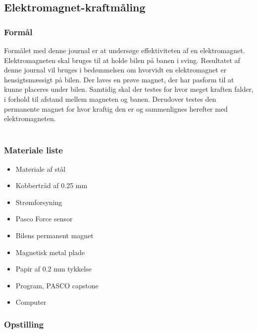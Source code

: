 \subsection{Elektromagnet-kraftmåling}\label{bilag_elektromagnet}
\label{Elektrojournal}
\subsubsection*{Formål}
Formålet med denne journal er at undersøge effektiviteten af en elektromagnet. Elektromagneten skal bruges til at holde bilen på banen i sving. Resultatet af denne journal vil bruges i bedømmelsen om hvorvidt en elektromagnet er hensigtsmæssigt på bilen. Der laves en prøve magnet, der har pasform til at kunne placeres under bilen. Samtidig skal der testes for hvor meget kraften falder, i forhold til afstand mellem magneten og banen. Derudover testes den permanente magnet for hvor kraftig den er og sammenlignes herefter med elektromagneten.\\
\\
\subsubsection*{Materiale liste}
\begin{itemize}
	\item Materiale af stål
	\item Kobbertråd af 0.25 mm
	\item Strømforsyning
	\item Pasco Force sensor
	\item Bilens permanent magnet
	\item Magnetisk metal plade
	\item Papir af 0.2 mm tykkelse
	\item Program, PASCO capstone
	\item Computer
\end{itemize}
 
\subsubsection*{Opstilling}

